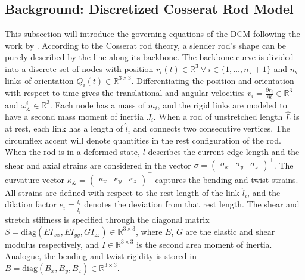 \subsection{Background: Discretized Cosserat Rod Model}\label{sub:hsamodel:hsa_robot_simulation:discretized_cosserat_rod_model}
This subsection will introduce the governing equations of the \gls{DCM} following the work by \citet{gazzola2018forward}.
According to the Cosserat rod theory, a slender rod's shape can be purely described by the line along its backbone. %
The backbone curve is divided into a discrete set of nodes with position $r_i(t) \in \mathbb{R}^3 \: \forall \: i \in \{1,\dots,n_\mathrm{v}+1\}$ and $n_\mathrm{v}$ links of orientation $Q_i(t) \in \mathbb{R}^{3 \times 3}$.
Differentiating the position and orientation with respect to time gives the translational and angular velocities $v_i = \frac{\partial r_i}{\partial t} \in \mathbb{R}^3$ and $\omega_{\mathcal{L}}^i \in \mathbb{R}^3$.
Each node has a mass of $m_i$, and the rigid links are modeled to have a second mass moment of inertia $J_i$.
When a rod of unstretched length $\hat{L}$ is at rest, each link has a length of $\hat{l}_i$ and connects two consecutive vertices. 
The circumflex accent will denote quantities in the rest configuration of the rod.
When the rod is in a deformed state, $l$ describes the current edge length and
the shear and axial strains are considered in the vector $\sigma = \begin{pmatrix} \sigma_x & \sigma_y & \sigma_z \end{pmatrix}^\top$. The curvature vector $\kappa_{\mathcal{L}} = \begin{pmatrix} \kappa_x & \kappa_y & \kappa_z \end{pmatrix}^\top$ captures the bending and twist strains.
All strains are defined with respect to the rest length of the link $\hat{l}_i$, and the dilation factor $e_i = \frac{l_i}{\hat{l}_i}$ denotes the deviation from that rest length.
The shear and stretch stiffness is specified through the diagonal matrix $S = \mathrm{diag}(E I_{xx}, E I_{yy}, G I_{zz}) \in \mathbb{R}^{3 \times 3}$, where $E$, $G$ are the elastic and shear modulus respectively, and $I \in \mathbb{R}^{3 \times 3}$ is the second area moment of inertia. Analogue, the bending and twist rigidity is stored in $B = \mathrm{diag}(B_x, B_y, B_z) \in \mathbb{R}^{3 \times 3}$.
